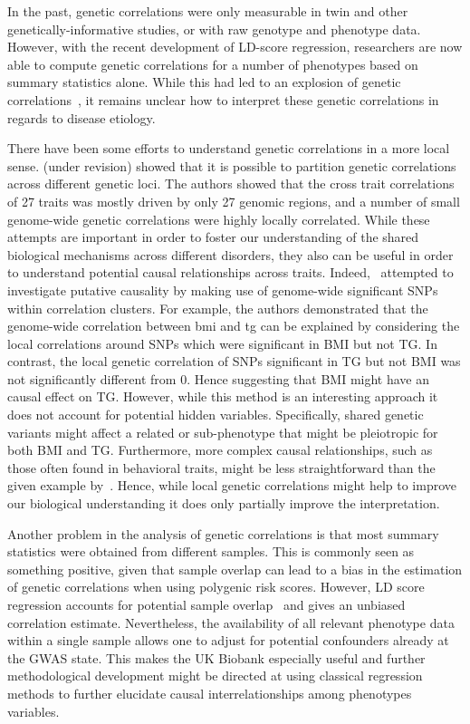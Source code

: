 In the past, genetic correlations were only measurable in twin and other genetically-informative studies, or with  raw genotype and phenotype data.
However, with the recent development of LD-score regression, researchers are now able to compute genetic correlations for     a number of phenotypes based on summary statistics alone.
While this had led to an explosion of genetic correlations~\cite{Bulik-Sullivan2015b,Bulik-Sullivan2015a}, it remains unclear how to interpret these genetic correlations in regards to disease etiology.

There have been some efforts to understand genetic correlations in a more local sense.
\citet{Shi2016a} (under revision) showed that it is possible to partition genetic correlations across different genetic loci.
The authors showed that the cross trait correlations of 27 traits was mostly driven by only 27 genomic regions, and a number of small genome-wide genetic correlations were highly locally correlated.
While these attempts are important in order to foster our understanding of the shared biological mechanisms across different disorders, they also can be useful in order to understand potential causal relationships across traits.
Indeed,~\citet{Shi2016a} attempted to investigate putative causality by making use of genome-wide significant SNPs within correlation clusters.
For example, the authors demonstrated that the genome-wide correlation between \acrfull{bmi} and \acrfull{tg} can be explained by considering the local correlations around SNPs which were significant in BMI but not TG\@.
In contrast, the local genetic correlation of SNPs significant in TG  but not BMI was not significantly different from $0$.
Hence suggesting that BMI might have an causal effect on TG\@.
However, while this method is an interesting approach it does not account for potential hidden variables.
Specifically, shared genetic variants might affect a related or sub-phenotype that might be pleiotropic for both BMI and TG\@.
Furthermore, more complex causal relationships, such as those often found in behavioral traits, might be less straightforward than the given example by~\citet{Shi2016a}.
Hence, while local genetic correlations might help to improve our biological understanding it does only partially improve the interpretation.

Another problem in the analysis of genetic correlations is that most summary statistics were obtained from different samples.
This is commonly seen as something positive, given that sample overlap can lead to a bias in the estimation of genetic correlations when using polygenic risk scores. 
However, LD score regression accounts for potential sample overlap~\cite{Bulik-Sullivan2015a} and gives an unbiased correlation estimate.  
Nevertheless, the availability of all relevant phenotype data within a single sample allows one to adjust for potential confounders already at the GWAS state.
This makes the UK Biobank especially useful and further methodological development might be directed at using classical regression methods to further elucidate causal interrelationships among phenotypes variables.

